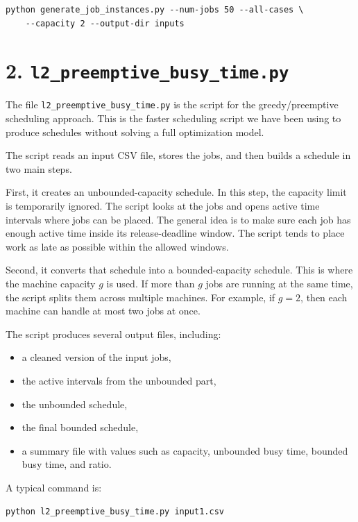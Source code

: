 \documentclass[12pt]{article}
\begin{document}
\begin{verbatim}
python generate_job_instances.py --num-jobs 50 --all-cases \
    --capacity 2 --output-dir inputs
\end{verbatim}

\section*{2. \texttt{l2\_preemptive\_busy\_time.py}}

The file \texttt{l2\_preemptive\_busy\_time.py} is the script for the
greedy/preemptive scheduling approach. This is the faster scheduling script we
have been using to produce schedules without solving a full optimization model.

The script reads an input CSV file, stores the jobs, and then builds a schedule
in two main steps.

First, it creates an unbounded-capacity schedule. In this step, the capacity
limit is temporarily ignored. The script looks at the jobs and opens active time
intervals where jobs can be placed. The general idea is to make sure each job has
enough active time inside its release-deadline window. The script tends to place
work as late as possible within the allowed windows.

Second, it converts that schedule into a bounded-capacity schedule. This is where
the machine capacity \(g\) is used. If more than \(g\) jobs are running at the
same time, the script splits them across multiple machines. For example, if
\(g=2\), then each machine can handle at most two jobs at once.

The script produces several output files, including:

\begin{itemize}[leftmargin=*]
    \item a cleaned version of the input jobs,
    \item the active intervals from the unbounded part,
    \item the unbounded schedule,
    \item the final bounded schedule,
    \item a summary file with values such as capacity, unbounded busy time,
    bounded busy time, and ratio.
\end{itemize}

A typical command is:

\begin{verbatim}
python l2_preemptive_busy_time.py input1.csv
\end{verbatim}
\end{document}
